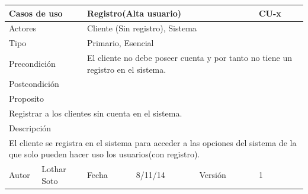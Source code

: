 \documentclass{article}
\begin{document}
\begin{table}[h]
\begin{tabular}{|l|l|l|l|l|l|}
\hline
\multicolumn{2}{|p{2cm}|}{Casos de uso}  & \multicolumn{3}{p{7cm}|}{\textbf{Registro(Alta usuario)}} & CU-x \\
\hline
\multicolumn{2}{|p{2cm}|}{Actores}       & \multicolumn{4}{p{8cm}|}{Cliente (Sin registro), Sistema}        \\
\hline
\multicolumn{2}{|p{2cm}|}{Tipo}          & \multicolumn{4}{p{8cm}|}{Primario, Esencial}        \\
\hline
\multicolumn{2}{|p{2cm}|}{Precondición}  & \multicolumn{4}{p{8cm}|}{El cliente no debe poseer cuenta y por tanto no tiene un registro en el sistema.}        \\
\hline
\multicolumn{2}{|p{2cm}|}{Postcondición} & \multicolumn{4}{p{8cm}|}{}        \\
\hline
\multicolumn{6}{|p{10cm}|}{Proposito}                                   \\
\hline
\multicolumn{6}{|p{10cm}|}{Registrar a los clientes sin cuenta en el sistema.}                                            \\
\hline
\multicolumn{6}{|p{10cm}|}{Descripción}                                 \\
\hline
\multicolumn{6}{|p{10cm}|}{El cliente se registra en el sistema para acceder a las opciones del sistema de la que solo pueden hacer uso los usuarios(con registro).}                                            \\
\hline
Autor              &     Lothar Soto         & Fecha    &  8/11/14   &   Versión  & 1\\     
\hline
\end{tabular}
\end{table}

\clearpage
\end{document}
